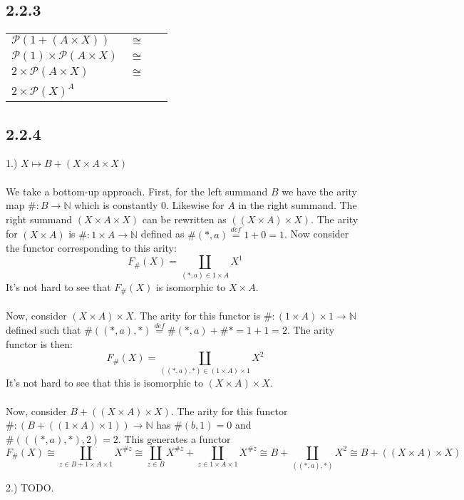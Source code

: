 \documentclass{article}
\newcommand{\defeq}{\overset{\mathit{def}}{=}}
\begin{document}
\subsection*{2.2.3}

\begin{tabular}{lll}
$\mathcal P(1 + (A \times X))$ & $\cong$ & \\
$\mathcal P(1) \times \mathcal P(A \times X)$ & $\cong$ & \\ 
$2 \times \mathcal P(A \times X)$ & $\cong$ & \\
$2 \times \mathcal P(X)^A$ & ~ & ~  
\end{tabular}

\subsection*{2.2.4}
 
1.) $X \mapsto B + (X \times A \times X)$\\~\\ 
We take a bottom-up approach. First, for the left summand $B$ we have the arity map $\# : B \to \mathbb N$ which
is constantly 0. Likewise for $A$ in the right summand. The right summand $(X \times A \times X)$ can be rewritten
as $((X \times A) \times X)$. The arity for $(X \times A)$ is $\# : 1 \times A \to \mathbb N$ defined as $\# (\ast, a) \defeq 1 + 0 = 1$. Now consider the functor corresponding to this arity:
$$F_{\#} (X) = \coprod_{(\ast,a) \in 1 \times A} X^{1}$$ 
It's not hard to see that $F_{\#}(X)$ is isomorphic to $X \times A$.\\~\\
Now, consider $(X \times A) \times X$. The arity for this functor is $\# : (1 \times A) \times 1 \to \mathbb N$ defined
such that $\#((\ast,a),\ast) \defeq \#(\ast,a) + \# \ast = 1 + 1 = 2$. The arity functor is then:
$$F_{\#}(X) = \coprod_{((\ast,a),\ast) \in (1 \times A) \times 1} X^{2} $$
It's not hard to see that this is isomorphic to $(X \times A) \times X$.\\~\\
Now, consider $B + ((X \times A) \times X)$. The arity for this functor $\# : (B + ((1 \times A) \times 1)) \to \mathbb N$
has $\# (b,1) = 0$ and $\# (((\ast, a),\ast),2) = 2$. This generates a functor
$$F_{\#}(X) \cong \coprod_{z \in B + 1 \times A \times 1} X^{\# z} \cong \coprod_{z \in B} X^{\#z} + \coprod_{z \in 1 \times A \times 1} X^{\# z} \cong  B + \coprod_{((\ast,a),\ast)} X^2 \cong B + ((X \times A) \times X)$$ 

2.) TODO.
\end{document}
